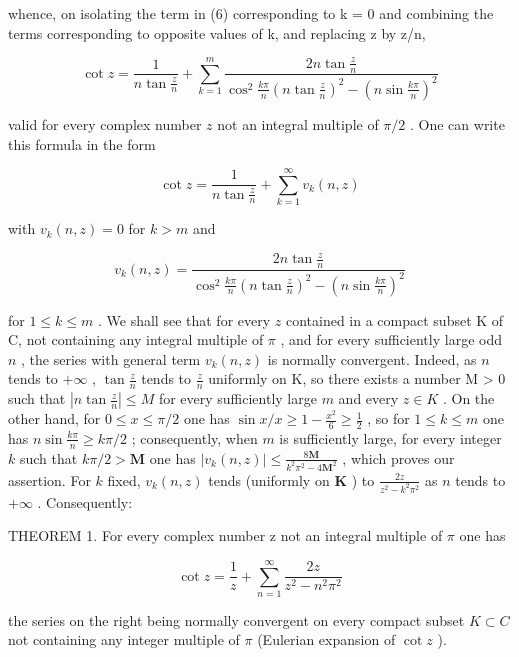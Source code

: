 whence, on isolating the term in (6) corresponding to k = 0 and combining the terms corresponding to opposite values of k, and replacing z by z/n,

\[
\cot z = \frac {1}{n \tan \frac {z}{n}} + \sum_ {k = 1} ^ {m} \frac {2 n \tan \frac {z}{n}}{\cos^ {2} \frac {k \pi}{n} \left(n \tan \frac {z}{n}\right) ^ {2} - \left(n \sin \frac {k \pi}{n}\right) ^ {2}}\tag{7}
\]

valid for every complex number \(z\) not an integral multiple of \(\pi / 2\) . One can write this formula in the form

\[
\cot z = \frac {1}{n \tan \frac {z}{n}} + \sum_ {k = 1} ^ {\infty} v _ {k} (n, z)
\]

with \(v_{k}(n,z) = 0\) for \(k > m\) and

\[
v _ {k} (n, z) = \frac {2 n \tan \frac {z}{n}}{\cos^ {2} \frac {k \pi}{n} \left(n \tan \frac {z}{n}\right) ^ {2} - \left(n \sin \frac {k \pi}{n}\right) ^ {2}}
\]

for \(1 \leqslant k \leqslant m\) . We shall see that for every \(z\) contained in a compact subset K of C, not containing any integral multiple of \(\pi\) , and for every sufficiently large odd \(n\) , the series with general term \(v_{k}(n,z)\) is normally convergent. Indeed, as \(n\) tends to \(+\infty\) , \(\tan \frac{z}{n}\) tends to \(\frac{z}{n}\) uniformly on K, so there exists a number M \textgreater{} 0 such that \(\left| n \tan \frac{z}{n} \right| \leqslant M\) for every sufficiently large \(m\) and every \(z \in K\) . On the other hand, for \(0 \leqslant x \leqslant \pi/2\) one has \(\sin x/x \geqslant 1 - \frac{x^2}{6} \geqslant \frac{1}{2}\) , so for \(1 \leqslant k \leqslant m\) one has \(n \sin \frac{k\pi}{n} \geqslant k\pi/2\) ; consequently, when \(m\) is sufficiently large, for every integer \(k\) such that \(k\pi / 2 > \mathbf{M}\) one has \(|v_k(n, z)| \leqslant \frac{8\mathbf{M}}{k^2\pi^2 - 4\mathbf{M}^2}\) , which proves our assertion. For \(k\) fixed, \(v_k(n, z)\) tends (uniformly on \(\mathbf{K}\) ) to \(\frac{2z}{z^2 - k^2\pi^2}\) as \(n\) tends to \(+\infty\) . Consequently:

THEOREM 1. For every complex number z not an integral multiple of \(\pi\) one has

\[
\cot z = \frac {1}{z} + \sum_ {n = 1} ^ {\infty} \frac {2 z}{z ^ {2} - n ^ {2} \pi^ {2}}\tag{8}
\]

the series on the right being normally convergent on every compact subset \(K \subset C\) not containing any integer multiple of \(\pi\) (Eulerian expansion of \(\cot z\) ).

